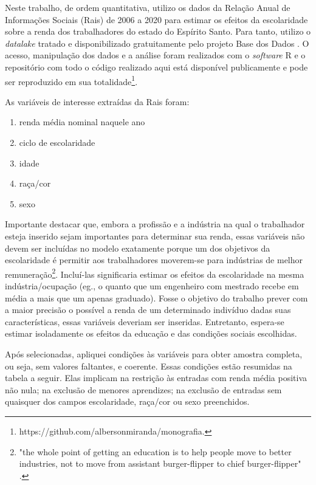 \documentclass[
  12pt,
  letterpaper,
  DIV=11,
  numbers=noendperiod]{scrartcl}
\providecommand{\tightlist}{%
  \setlength{\itemsep}{0pt}\setlength{\parskip}{0pt}}\usepackage{longtable,booktabs,array}
\begin{document}
Neste trabalho, de ordem quantitativa, utilizo os dados da Relação Anual
de Informações Sociais (Rais) de 2006 a 2020 para estimar os efeitos da
escolaridade sobre a renda dos trabalhadores do estado do Espírito
Santo. Para tanto, utilizo o \emph{datalake} tratado e disponibilizado
gratuitamente pelo projeto Base dos Dados \citep{basedosdados}. O
acesso, manipulação dos dados e a análise foram realizados com o
\emph{software} R \citep{r} e o repositório com todo o código realizado
aqui está disponível publicamente e pode ser reproduzido em sua
totalidade\footnote{https://github.com/albersonmiranda/monografia.}.

As variáveis de interesse extraídas da Rais foram:

\begin{enumerate}
\def\labelenumi{\arabic{enumi}.}
\tightlist
\item
  renda média nominal naquele ano
\item
  ciclo de escolaridade
\item
  idade
\item
  raça/cor
\item
  sexo
\end{enumerate}

Importante destacar que, embora a profissão e a indústria na qual o
trabalhador esteja inserido sejam importantes para determinar sua renda,
essas variáveis não devem ser incluídas no modelo exatamente porque um
dos objetivos da escolaridade é permitir aos trabalhadores moverem-se
para indústrias de melhor
remuneração\footnote{"the whole point of getting an education is to help people move to better industries, not to move from assistant burger-flipper to chief burger-flipper" \citep{cochrane}.}.
Incluí-las significaria estimar os efeitos da escolaridade na mesma
indústria/ocupação (eg., o quanto que um engenheiro com mestrado recebe
em média a mais que um apenas graduado). Fosse o objetivo do trabalho
prever com a maior precisão o possível a renda de um determinado
indivíduo dadas suas características, essas variáveis deveriam ser
inseridas. Entretanto, espera-se estimar isoladamente os efeitos da
educação e das condições sociais escolhidas.

Após selecionadas, apliquei condições às variáveis para obter amostra
completa, ou seja, sem valores faltantes, e coerente. Essas condições
estão resumidas na tabela a seguir. Elas implicam na restrição às
entradas com renda média positiva não nula; na exclusão de menores
aprendizes; na exclusão de entradas sem quaisquer dos campos
escolaridade, raça/cor ou sexo preenchidos.
\end{document}
